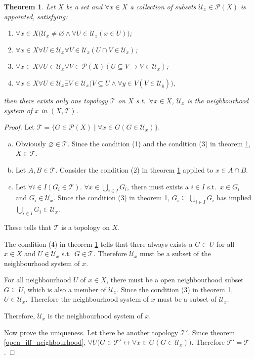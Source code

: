 \documentclass{article}%
\theoremstyle{plain}
\newtheorem{theorem}{Theorem}[section] %
\theoremstyle{definition}
\begin{document}
\begin{theorem}\label{topology_built_on_neighbourhood}
Let $X$ be a set and $\forall x \in X$ a collection of subsets $\mathscr U_x \in \mathscr P(X)$ is appointed, satisfying:
\begin{enumerate}[(1)]
\item $\forall x\in X\big(
	\mathscr U_x \neq \varnothing \wedge
		\forall U\in \mathscr U_x (x\in U)\big)$; 
\item $\forall x\in X\forall U\in\mathscr U_x\forall V\in\mathscr U_x (
	U\cap V\in \mathscr U_x)$;
\item $\forall x\in X\forall U\in\mathscr U_x\forall V\in \mathscr P(X)( 
	U\subseteq V \to V\in \mathscr U_x)$;
\item $\forall x\in X\forall U\in\mathscr U_x\exists V\in\mathscr U_x \big(
	V\subseteq U \wedge \forall y\in V(V\in \mathscr U_y)\big)$,
\end{enumerate}
then there exists only one topology $\mathscr T$ on $X$ s.t.\ $\forall x\in X$, $\mathscr U_x$ is the neighbourhood system of $x$ in $(X,\mathscr T)$.
\end{theorem}
\begin{proof}
Let $\mathscr T = \{G\in \mathscr P(X) \mid \forall x\in G( G\in \mathscr U_x)\}$.
\begin{enumerate}[a)]
\item Obviously $\varnothing \in \mathscr T$. 
	Since the condition (1) and the condition (3) in theorem \ref{topology_built_on_neighbourhood}, $X\in \mathscr T$.
\item Let $A, B\in \mathscr T$. Consider the condition (2) in theorem \ref{topology_built_on_neighbourhood} applied to $x\in A\cap B$.
\item Let $\forall i\in I( G_i \in \mathscr T)$. 
$\forall x\in \bigcup_{i\in I} G_i$, there must exists a $i\in I$ s.t.\ $x\in G_i$ and $G_i \in \mathscr U_x$. 
Since the condition (3) in theorem \ref{topology_built_on_neighbourhood}, $G_i \subseteq \bigcup_{i\in I} G_i$ has implied $\bigcup_{i\in I} G_i \in \mathscr U_x$.
\end{enumerate}
These tells that $\mathscr T$ is a topology on $X$.

The condition (4) in theorem \ref{topology_built_on_neighbourhood} tells that there always exists a $G\subset U$ for all $x\in X$ and $U\in \mathscr U_x$ s.t.\ $G\in \mathscr T$. Therefore $\mathscr U_x$ must be a subset of the neighbourhood system of $x$. 

For all neighbourhood $U$ of $x\in X$, there must be a open neighbourhood subset $G\subseteq U$, which is also a member of $\mathscr U_x$. Since the condition (3) in theorem \ref{topology_built_on_neighbourhood}, $U\in \mathscr U_x$. Therefore the neighbourhood system of $x$ must be a subset of $\mathscr U_x$. 

Therefore, $\mathscr U_x$ is the neighbourhood system of $x$.

Now prove the uniqueness. Let there be another topology $\mathscr T '$.
Since theorem \ref{open_iff_neighbourhood}, 
$\forall U\big(
	G\in \mathscr T' \leftrightarrow 
		\forall x\in G(
			G\in \mathscr U_x)\big)$. 
Therefore $\mathscr T' = \mathscr T$.
\end{proof}
\end{document}
